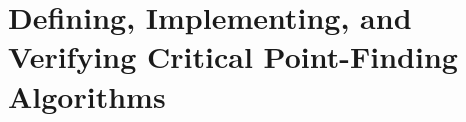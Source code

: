 \documentclass[../../thesis.tex]{subfiles}
\begin{document}
\chapter{Defining, Implementing, and Verifying
Critical Point-Finding Algorithms}

\onlyinsubfile{\printbibliography}
\end{document}
